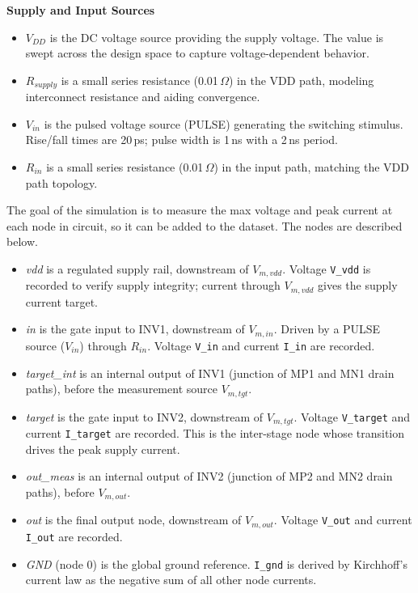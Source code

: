 \documentclass[10pt,twocolumn,letterpaper]{article}
\begin{document}
\noindent \textbf{\normalsize Supply and Input Sources}
\begin{itemize}[nosep]
  \item \textit{$V_{DD}$} is the DC voltage source providing the supply voltage. The value is swept across the design space to capture voltage-dependent behavior.
  \item \textit{$R_{supply}$} is a small series resistance (0.01\,$\Omega$) in the VDD path, modeling interconnect resistance and aiding convergence.
  \item \textit{$V_{in}$} is the pulsed voltage source (PULSE) generating the switching stimulus. Rise/fall times are 20\,ps; pulse width is 1\,ns with a 2\,ns period.
  \item \textit{$R_{in}$} is a small series resistance (0.01\,$\Omega$) in the input path, matching the VDD path topology.\\
\end{itemize}

The goal of the simulation is to measure the max voltage and peak current at each node in circuit, so it can be added to the dataset.  The nodes are described below.

\begin{itemize}[nosep]
  \item \textit{vdd} is a regulated supply rail, downstream of $V_{m,vdd}$. Voltage \texttt{V\_vdd} is recorded to verify supply integrity; current through $V_{m,vdd}$ gives the supply current target.
  \item \textit{in} is the gate input to INV1, downstream of $V_{m,in}$. Driven by a PULSE source ($V_{in}$) through $R_{in}$. Voltage \texttt{V\_in} and current \texttt{I\_in} are recorded.
  \item \textit{target\_int} is an internal output of INV1 (junction of MP1 and MN1 drain paths), before the measurement source $V_{m,tgt}$.
  \item \textit{target} is the gate input to INV2, downstream of $V_{m,tgt}$. Voltage \texttt{V\_target} and current \texttt{I\_target} are recorded. This is the inter-stage node whose transition drives the peak supply current.
  \item \textit{out\_meas} is an internal output of INV2 (junction of MP2 and MN2 drain paths), before $V_{m,out}$.
  \item \textit{out} is the final output node, downstream of $V_{m,out}$. Voltage \texttt{V\_out} and current \texttt{I\_out} are recorded.
  \item \textit{GND} (node 0) is the global ground reference. \texttt{I\_gnd} is derived by Kirchhoff's current law as the negative sum of all other node currents.\\
\end{itemize}
\end{document}
